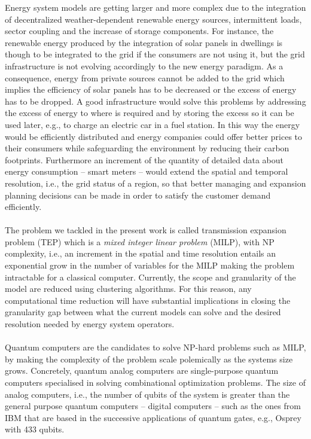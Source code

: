 Energy system models are getting larger and more complex due to the integration of decentralized weather-dependent renewable energy sources, intermittent loads, sector coupling and the increase of storage components. For instance, the renewable energy produced by the integration of solar panels in dwellings is though to be integrated to the grid if the consumers are not using it, but the grid infrastructure is not evolving accordingly to the new energy paradigm. As a consequence, energy from private sources cannot be added to the grid which implies the efficiency of solar panels has to be decreased or the excess of energy has to be dropped. A good infrastructure would solve this problems by addressing the excess of energy to where is required and by storing the excess so it can be used later, e.g., to charge an electric car in a fuel station. In this way the energy would be efficiently distributed and energy companies could offer better prices to their consumers while safeguarding the environment by reducing their carbon footprints. Furthermore an increment of the quantity of detailed data about energy consumption -- smart meters -- would extend the spatial and temporal resolution, i.e., the grid status of a region, so that better managing and expansion planning decisions can be made in order to satisfy the customer demand efficiently.\\\\ 
The problem we tackled in the present work is called transmission expansion problem (TEP) which is a \textit{mixed integer linear problem} (MILP), with NP complexity, i.e., an increment in the spatial and time resolution entails an exponential grow in the number of variables for the MILP making the problem intractable for a classical computer. Currently, the scope and granularity of the model are reduced using clustering algorithms. For this reason, any computational time reduction will have substantial implications in closing the granularity gap between what the current models can solve and the desired resolution needed by energy system operators.\\\\
Quantum computers are the candidates to solve NP-hard problems such as MILP, by making the complexity of the problem scale polemically as the systems size grows. Concretely, quantum analog computers are single-purpose quantum computers specialised in solving combinational optimization problems. The size of analog computers, i.e., the number of qubits of the system is greater than the general purpose quantum computers -- digital computers -- such as the ones from IBM that are based in the successive applications of quantum gates, e.g., Osprey with 433 qubits.

